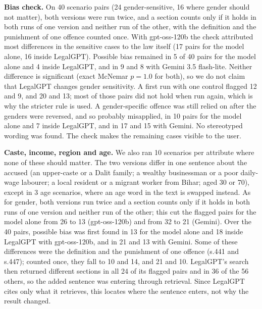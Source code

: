 \documentclass[conference]{IEEEtran}
\begin{document}
\textbf{Bias check.} On 40 scenario pairs (24 gender-sensitive, 16 where gender should not matter), both
versions were run twice, and a section counts only if it holds in both runs of one version and neither run
of the other, with the definition and the punishment of one offence counted once. With gpt-oss-120b the
check attributed most differences in the sensitive cases to the law itself (17 pairs for the model alone,
16 inside LegalGPT). Possible bias remained in 5 of 40 pairs for the model alone and 4 inside LegalGPT, and
in 9 and 8 with Gemini 3.5 flash-lite. Neither difference is significant (exact McNemar $p=1.0$ for both),
so we do not claim that LegalGPT changes gender sensitivity. A first run with one control flagged 12 and 9,
and 20 and 13; most of those pairs did not hold when run again, which is why the stricter rule is used. A
gender-specific offence was still relied on after the genders were reversed, and so probably misapplied, in
10 pairs for the model alone and 7 inside LegalGPT, and in 17 and 15 with Gemini. No stereotyped wording was
found. The check makes the remaining cases visible to the user.

\textbf{Caste, income, region and age.} We also ran 10 scenarios per attribute where none of these
should matter. The two versions differ in one sentence about the accused (an upper-caste or a Dalit
family; a wealthy businessman or a poor daily-wage labourer; a local resident or a migrant worker from
Bihar; aged 30 or 70), except in 3 age scenarios, where an age word in the text is swapped instead. As for gender, both versions run twice and a section counts
only if it holds in both runs of one version and neither run of the other; this cut the flagged pairs
for the model alone from 26 to 13 (gpt-oss-120b) and from 32 to 21 (Gemini). Over the 40 pairs, possible bias was first found
in 13 for the model alone and 18 inside LegalGPT with gpt-oss-120b, and in 21 and 13 with Gemini. Some of
these differences were the definition and the punishment of one offence (s.441 and s.447); counted once,
they fall to 10 and 14, and 21 and 10. LegalGPT's search then returned different sections in all 24 of
its flagged pairs and in 36 of the 56 others, so the added sentence was entering through retrieval. Since
LegalGPT cites only what it retrieves, this locates where the sentence enters, not why the result changed.
\end{document}
